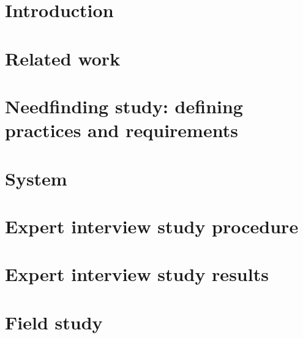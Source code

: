 \documentclass[acmsmall,screen]{acmart}
\begin{document}



\maketitle


\section{Introduction}\label{s:intro}



\section{Related work}\label{s:related}


\section{Needfinding study: defining practices and requirements}\label{s:needs}




\section{System}\label{s:system}



\section{Expert interview study procedure}\label{s:usabilitystudy}



\section{Expert interview study results}\label{s:qualresults}



\section{Field study}\label{s:fieldstudy}

\end{document}

